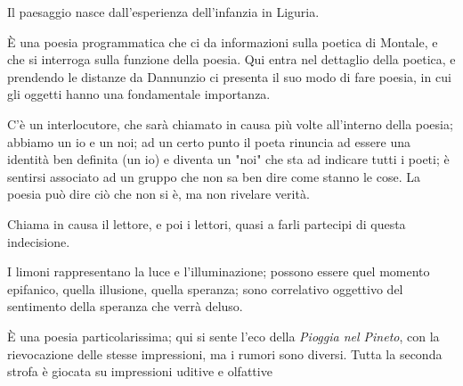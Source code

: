 Il paesaggio nasce dall'esperienza dell'infanzia in Liguria.


È una poesia programmatica che ci da informazioni sulla poetica di Montale, e che si interroga sulla funzione della poesia. Qui entra nel dettaglio della poetica, e prendendo le distanze da Dannunzio ci presenta il suo modo di fare poesia, in cui gli oggetti hanno una fondamentale importanza.

C'è un interlocutore, che sarà chiamato in causa più volte all'interno della poesia; abbiamo un io e un noi; ad un certo punto il poeta rinuncia ad essere una identità ben definita (un io) e diventa un "noi" che sta ad indicare tutti i poeti; è sentirsi associato ad un gruppo che non sa ben dire come stanno le cose.
La poesia può dire ciò che non si è, ma non rivelare verità.

Chiama in causa il lettore, e poi i lettori, quasi a farli partecipi di questa indecisione.


I limoni rappresentano la luce e l'illuminazione; possono essere quel momento epifanico, quella illusione, quella speranza; sono correlativo oggettivo del sentimento della speranza che verrà deluso.

È una poesia particolarissima; qui si sente l'eco della \textit{Pioggia nel Pineto}, con la rievocazione delle stesse impressioni, ma i rumori sono diversi. Tutta la seconda strofa è giocata su impressioni uditive e olfattive


